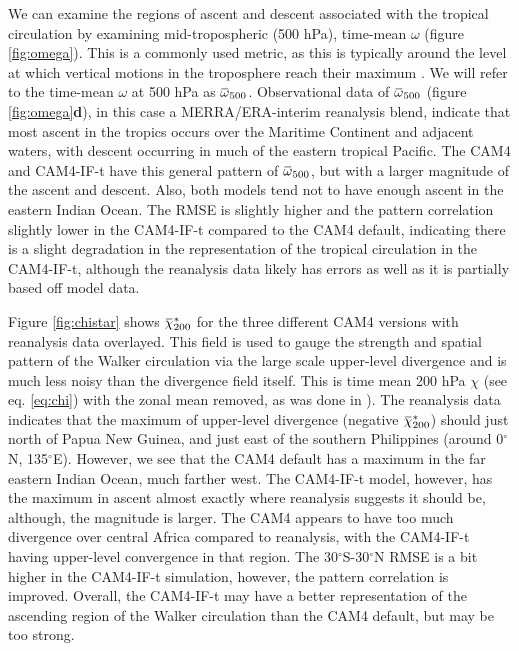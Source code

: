 \documentclass[letterpaper,12pt,titlepage,oneside,final]{book}
\newcommand{\overbar}[1]{\mkern 1.5mu\overline{\mkern-1.5mu#1\mkern-1.5mu}\mkern 1.5mu}
\begin{document}
We can examine the regions of ascent and descent associated with the tropical circulation by examining mid-tropospheric (500 hPa), time-mean $\omega$ (figure \ref{fig:omega}). This is a commonly used metric, as this is typically around the level at which vertical motions in the troposphere reach their maximum \citep{vecchi_global_2007}. We will refer to the time-mean $\omega$ at 500 hPa as $\overbar{\omega}_{500}$.
Observational data of $\overbar{\omega}_{500}$ (figure \ref{fig:omega}\textbf{d}), in this case a MERRA/ERA-interim reanalysis blend, indicate that most ascent in the tropics occurs over the Maritime Continent and adjacent waters, with descent occurring in much of the eastern tropical Pacific. The CAM4 and CAM4-IF-t have this general pattern of $\overbar{\omega}_{500}$, but with a larger magnitude of the ascent and descent. Also, both models tend not to have enough ascent in the eastern Indian Ocean. The RMSE is slightly higher and the pattern correlation slightly lower in the CAM4-IF-t compared to the CAM4 default, indicating there is a slight degradation in the representation of the tropical circulation in the CAM4-IF-t, although the reanalysis data likely has errors as well as it is partially based off model data.

Figure \ref{fig:chistar} shows $\overbar{\chi}^{*}_{200}$ for the three different CAM4 versions with reanalysis data overlayed. This field is used to gauge the strength and spatial pattern of the Walker circulation via the large scale upper-level divergence and is much less noisy than the divergence field itself. This is time mean 200 hPa $\chi$ (see eq. \ref{eq:chi}) with the zonal mean removed, as was done in \cite{tanaka_trend_2004}). The reanalysis data indicates that the maximum of upper-level divergence (negative $\overbar{\chi}^{*}_{200}$) should just north of Papua New Guinea, and just east of the southern Philippines (around 0$^{\circ}$N, 135$^{\circ}$E). However, we see that the CAM4 default has a maximum in the far eastern Indian Ocean, much farther west. The CAM4-IF-t model, however, has the maximum in ascent almost exactly where reanalysis suggests it should be, although, the magnitude is larger. The CAM4 appears to have too much divergence over central Africa compared to reanalysis, with the CAM4-IF-t having upper-level convergence in that region. The 30$^{\circ}$S-30$^{\circ}$N RMSE is a bit higher in the CAM4-IF-t simulation, however, the pattern correlation is improved. Overall, the CAM4-IF-t may have a better representation of the ascending region of the Walker circulation than the CAM4 default, but may be too strong.
\end{document}
